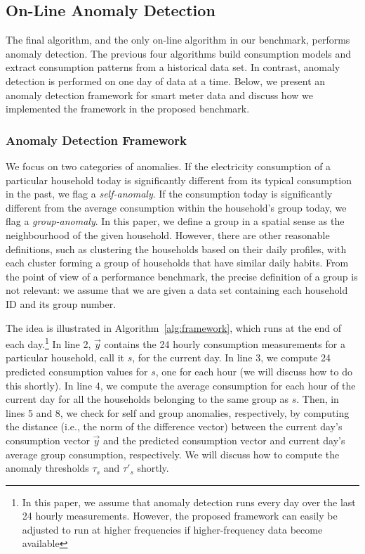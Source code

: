 \documentclass[prodmode,acmtods]{acmsmall}
\begin{document}
\subsection{On-Line Anomaly Detection}

The final algorithm, and the only on-line algorithm in our benchmark, performs anomaly detection.  The previous four algorithms build consumption models and extract consumption patterns from a historical data set.  In contrast, anomaly detection is performed on one day of data at a time.  Below, we present an anomaly detection framework for smart meter data and discuss how we implemented the framework in the proposed benchmark.

\subsubsection{Anomaly Detection Framework}

We focus on two categories of anomalies.  If the electricity consumption of a particular household today is significantly different from its typical consumption in the past, we flag a \emph{self-anomaly}.  If the consumption today is significantly different from the average consumption within the household's group today, we flag a \emph{group-anomaly}.  In this paper, we define a group in a spatial sense as the neighbourhood of the given household.  However, there are other reasonable definitions, such as clustering the households based on their daily profiles, with each cluster forming a group of households that have similar daily habits.  From the point of view of a performance benchmark, the precise definition of a group is not relevant: we assume that we are given a data set containing each household ID and its group number.

The idea is illustrated in Algorithm~\ref{alg:framework}, which runs at the end of each day.\footnote{In this paper, we assume that anomaly detection runs every day over the last 24 hourly measurements.  However, the proposed framework can easily be adjusted to run at higher frequencies if higher-frequency data become available}  In line 2, $\vec{y}$ contains the 24 hourly consumption measurements for a particular household, call it $s$, for the current day.  In line 3, we compute 24 predicted consumption values for $s$, one for each hour (we will discuss how to do this shortly).  In line 4, we compute the average consumption for each hour of the current day for all the households belonging to the same group as $s$.  Then, in lines 5 and 8, we check for self and group anomalies, respectively, by computing the distance (i.e., the norm of the difference vector) between the current day's consumption vector $\vec{y}$ and the predicted consumption vector and current day's average group consumption, respectively.  We will discuss how to compute the anomaly thresholds $\tau_s$ and $\tau'_s$ shortly. 
\end{document}
